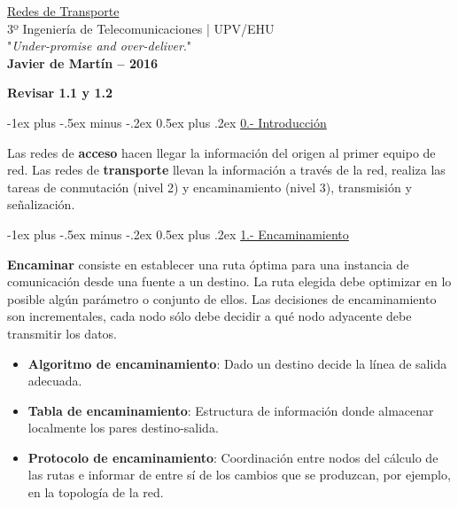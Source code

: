 \documentclass[10pt,portrait, twocolumn]{article}
\makeatletter
\renewcommand{\section}{\@startsection{section}{1}{0mm}%
                                {-1ex plus -.5ex minus -.2ex}%
                                {0.5ex plus .2ex}%
                                {\normalfont\large\bfseries}}
\makeatother
\begin{document}
\begin{framed}
	\begin{center}
    	\Large{\underline{Redes de Transporte}} \\
    	\scriptsize{3º Ingeniería de Telecomunicaciones | UPV/EHU}\\
     	"\textsl{Under-promise and over-deliver}." \\
     	\small{\textbf{Javier de Martín -- 2016}}
	\end{center}
\end{framed}

\textbf{Revisar 1.1 y 1.2}

\begin{center}
\section{\underline{0.- Introducción}}
\end{center}

Las redes de \textbf{acceso} hacen llegar la información del origen al primer equipo de red. Las redes de \textbf{transporte} llevan la información a través de la red, realiza las tareas de conmutación (nivel 2) y encaminamiento (nivel 3), transmisión y señalización.

\hrulefill

\section{\underline{1.- Encaminamiento}}

\textbf{Encaminar} consiste en establecer una ruta óptima para una instancia de comunicación desde una fuente a un destino. La ruta elegida debe optimizar en lo posible algún parámetro o conjunto de ellos. Las decisiones de encaminamiento son incrementales, cada nodo sólo debe decidir a qué nodo adyacente debe transmitir los datos.

\begin{itemize}
	\item \textbf{Algoritmo de encaminamiento}: Dado un destino decide la línea de salida adecuada.
	\item \textbf{Tabla de encaminamiento}: Estructura de información donde almacenar localmente los pares destino-salida.
	\item \textbf{Protocolo de encaminamiento}: Coordinación entre nodos del cálculo de las rutas e informar de entre sí de los cambios que se produzcan, por ejemplo, en la topología de la red.
\end{itemize}
\end{document}
